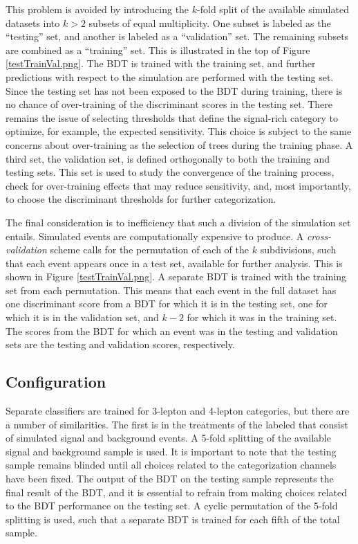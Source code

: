 This problem is avoided by introducing the $k$-fold split of the available simulated datasets into $k>2$ subsets of equal multiplicity.
One subset is labeled as the ``testing'' set, and another is labeled as a ``validation'' set.
The remaining subsets are combined as a ``training'' set.
This is illustrated in the top of Figure \ref{testTrainVal.png}.
The BDT is trained with the training set, and further predictions with respect to the simulation are performed with the testing set.
Since the testing set has not been exposed to the BDT during training, there is no chance of over-training of the discriminant scores in the testing set.
There remains the issue of selecting thresholds that define the signal-rich category to optimize, for example, the expected sensitivity.
This choice is subject to the same concerns about over-training as the selection of trees during the training phase. 
A third set, the validation set, is defined orthogonally to both the training and testing sets.
This set is used to study the convergence of the training process, check for over-training effects that may reduce sensitivity, and, most importantly, to choose the discriminant thresholds for further categorization.

The final consideration is to inefficiency that such a division of the simulation set entails.
Simulated events are computationally expensive to produce.
A \emph{cross-validation} scheme calls for the permutation of each of the $k$ subdivisions, such that each event appears once in a test set, available for further analysis.
This is shown in Figure \ref{testTrainVal.png}.
A separate BDT is trained with the training set from each permutation.
This means that each event in the full dataset has one discriminant score from a BDT for which it is in the testing set, one for which it is in the validation set, and $k-2$ for which it was in the training set.
The scores from the BDT for which an event was in the testing and validation sets are the testing and validation scores, respectively.

\subsection{Configuration}
\label{sec:hmmBdtConfiguration}

Separate classifiers are trained for 3-lepton and 4-lepton categories, but there are a number of similarities.
The first is in the treatments of the labeled that consist of simulated signal and background events.
A 5-fold splitting of the available signal and background sample is used.
It is important to note that the testing sample remains blinded until all choices related to the categorization channels have been fixed.
The output of the BDT on the testing sample represents the final result of the BDT, and it is essential to refrain from making choices related to the BDT performance on the testing set.
A cyclic permutation of the 5-fold splitting is used, such that a separate BDT is trained for each fifth of the total sample.

